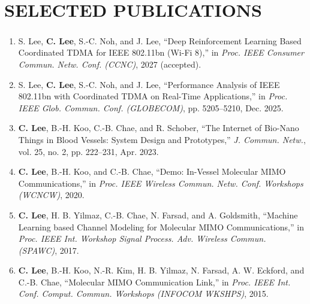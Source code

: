\documentclass[a4paper,9pt]{extarticle}
\begin{document}
\section*{SELECTED PUBLICATIONS}
\begin{enumerate}
    \item S. Lee\textsuperscript{\dag}, \textbf{C. Lee}\textsuperscript{\dag}, S.-C. Noh, and J. Lee, ``Deep Reinforcement Learning Based Coordinated TDMA for IEEE 802.11bn (Wi-Fi 8),'' in \textit{Proc. IEEE Consumer Commun. Netw. Conf. (CCNC)}, 2027 (accepted).
    \item S. Lee, \textbf{C. Lee}, S.-C. Noh, and J. Lee, ``Performance Analysis of IEEE 802.11bn with Coordinated TDMA on Real-Time Applications,'' in \textit{Proc. IEEE Glob. Commun. Conf. (GLOBECOM)}, pp. 5205--5210, Dec. 2025.
    \item \textbf{C. Lee}, B.-H. Koo, C.-B. Chae, and R. Schober, ``The Internet of Bio-Nano Things in Blood Vessels: System Design and Prototypes,'' \textit{J. Commun. Netw.}, vol. 25, no. 2, pp. 222--231, Apr. 2023.
    \item \textbf{C. Lee}, B.-H. Koo, and C.-B. Chae, ``Demo: In-Vessel Molecular MIMO Communications,'' in \textit{Proc. IEEE Wireless Commun. Netw. Conf. Workshops (WCNCW)}, 2020.
    \item \textbf{C. Lee}, H. B. Yilmaz, C.-B. Chae, N. Farsad, and A. Goldsmith, ``Machine Learning based Channel Modeling for Molecular MIMO Communications,'' in \textit{Proc. IEEE Int. Workshop Signal Process. Adv. Wireless Commun. (SPAWC)}, 2017.
    \item \textbf{C. Lee}, B.-H. Koo, N.-R. Kim, H. B. Yilmaz, N. Farsad, A. W. Eckford, and C.-B. Chae, ``Molecular MIMO Communication Link,'' in \textit{Proc. IEEE Int. Conf. Comput. Commun. Workshops (INFOCOM WKSHPS)}, 2015.
\end{enumerate}


\newpage
\end{document}
